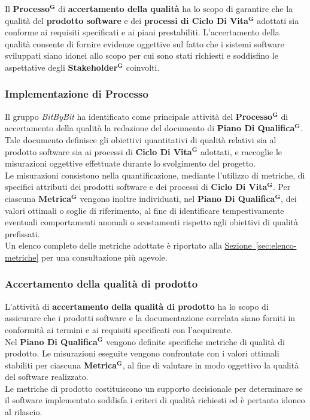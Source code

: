 \documentclass[a4paper,12pt]{article}
\newcommand{\term}[1]{\textbf{#1}$^\mathbf{G}$}
\begin{document}
Il \term{Processo} di \textbf{accertamento della qualità} ha lo scopo di garantire che la qualità del \textbf{prodotto software} e dei \textbf{processi di \term{Ciclo Di Vita}} adottati sia conforme ai requisiti specificati e ai piani prestabiliti.
L’accertamento della qualità consente di fornire evidenze oggettive sul fatto che i sistemi software sviluppati siano idonei allo scopo per cui sono stati richiesti e soddisfino le aspettative degli \term{Stakeholder} coinvolti.

\subsubsection{Implementazione di Processo}
Il gruppo \textit{BitByBit} ha identificato come principale attività del \term{Processo} di accertamento della qualità la redazione del documento di \textbf{\term{Piano Di Qualifica}}.
Tale documento definisce gli obiettivi quantitativi di qualità relativi sia al prodotto software sia ai processi di \term{Ciclo Di Vita} adottati, e raccoglie le misurazioni oggettive effettuate durante lo svolgimento del progetto.\\
Le misurazioni consistono nella quantificazione, mediante l’utilizzo di metriche, di specifici attributi dei prodotti software e dei processi di \term{Ciclo Di Vita}.
Per ciascuna \term{Metrica} vengono inoltre individuati, nel \term{Piano Di Qualifica}, dei valori ottimali o soglie di riferimento, al fine di identificare tempestivamente eventuali comportamenti anomali o scostamenti rispetto agli obiettivi di qualità prefissati.\\
Un elenco completo delle metriche adottate è riportato alla \hyperref[sec:elenco-metriche]{Sezione~\ref*{sec:elenco-metriche}} per una consultazione più agevole.

\subsubsection{Accertamento della qualità di prodotto}
L’attività di \textbf{accertamento della qualità di prodotto} ha lo scopo di assicurare che i prodotti software e la documentazione correlata siano forniti in conformità ai termini e ai requisiti specificati con l’acquirente.\\
Nel \term{Piano Di Qualifica} vengono definite specifiche metriche di qualità di prodotto.
Le misurazioni eseguite vengono confrontate con i valori ottimali stabiliti per ciascuna \term{Metrica}, al fine di valutare in modo oggettivo la qualità del software realizzato.\\
Le metriche di prodotto costituiscono un supporto decisionale per determinare se il software implementato soddisfa i criteri di qualità richiesti ed è pertanto idoneo al rilascio.
\end{document}

